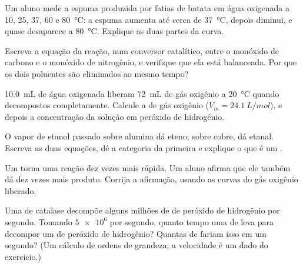 \begin{exercise}[$\star\star$]\label{exo:g12:catalysis:9}
Um aluno mede a espuma produzida por fatias de batata em água oxigenada
a 10, 25, 37, 60 e \qty{80}{\celsius}: a espuma aumenta até cerca de
\qty{37}{\celsius}, depois diminui, e quase desaparece a
\qty{80}{\celsius}. Explique as duas partes da curva.
\end{exercise}

\begin{exercise}[$\star\star$]\label{exo:g12:catalysis:10}
Escreva a equação da reação, num conversor catalítico, entre o monóxido
de carbono e o monóxido de nitrogênio, e verifique que ela está
balanceada. Por que os dois poluentes são eliminados ao mesmo tempo?
\end{exercise}

\begin{exercise}[$\star\star$]\label{exo:g12:catalysis:11}
\qty{10.0}{mL} de água oxigenada liberam \qty{72}{mL} de gás oxigênio a
\qty{20}{\celsius} quando decompostos completamente. Calcule a
 de gás oxigênio ($V_m = \qty{24.1}{L/mol}$), e
depois a concentração da solução em peróxido de hidrogênio.
\end{exercise}

\begin{exercise}[$\star\star\star$]\label{exo:g12:catalysis:12}
O vapor de etanol passado sobre alumina dá eteno; sobre cobre, dá
etanal. Escreva as duas equações, dê a categoria da primeira e explique
o que é um .
\end{exercise}

\begin{exercise}[$\star\star\star$]\label{exo:g12:catalysis:13}
Um  torna uma reação dez vezes mais rápida. Um aluno afirma
que ele também dá dez vezes mais produto. Corrija a afirmação, usando as
curvas do gás oxigênio liberado.
\end{exercise}

\begin{exercise}[$\star\star\star$]\label{exo:g12:catalysis:14}
Uma  de catalase decompõe alguns milhões de  de
peróxido de hidrogênio por segundo. Tomando $\num{5e6}$ por segundo,
quanto tempo uma  de  leva para decompor um  de
peróxido de hidrogênio? Quantas  de  fariam isso em um
segundo? (Um cálculo de ordens de grandeza; a velocidade é um dado do
exercício.)
\end{exercise}

